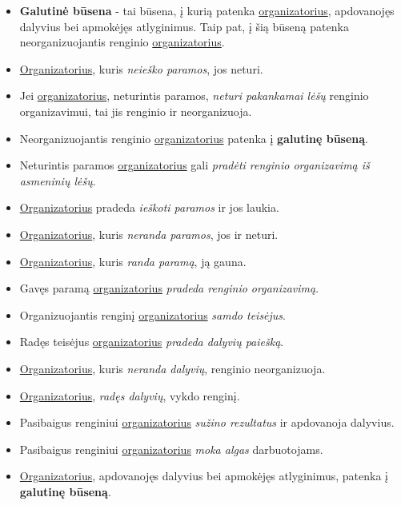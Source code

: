 \documentclass{VUMIFPSkursinis}
\begin{document}
    \begin{itemize}
      \item \textbf{Galutinė būsena} - tai būsena, į kurią patenka \underline{organizatorius}, apdovanojęs dalyvius bei apmokėjęs atlyginimus. Taip pat, į šią būseną patenka neorganizuojantis renginio \underline{organizatorius}.
      \item \underline{Organizatorius}, kuris \textit{neieško paramos}, jos neturi.
      \item Jei \underline{organizatorius}, neturintis paramos, \textit{neturi pakankamai lėšų} renginio organizavimui, tai jis renginio ir neorganizuoja.
      \item Neorganizuojantis renginio \underline{organizatorius} patenka į \textbf{galutinę būseną}.
      \item Neturintis paramos \underline{organizatorius} gali \textit{pradėti renginio organizavimą iš asmeninių lėšų}.
      \item \underline{Organizatorius} pradeda \textit{ieškoti paramos} ir jos laukia.
      \item \underline{Organizatorius}, kuris \textit{neranda paramos}, jos ir neturi.
      \item \underline{Organizatorius}, kuris \textit{randa paramą}, ją gauna.
      \item Gavęs paramą \underline{organizatorius} \textit{pradeda renginio organizavimą}.
      \item Organizuojantis renginį \underline{organizatorius} \textit{samdo teisėjus}.
      \item Radęs teisėjus \underline{organizatorius} \textit{pradeda dalyvių paiešką}.
      \item \underline{Organizatorius}, kuris \textit{neranda dalyvių}, renginio neorganizuoja.
      \item \underline{Organizatorius}, \textit{radęs dalyvių}, vykdo renginį.
      \item Pasibaigus renginiui \underline{organizatorius} \textit{sužino rezultatus} ir apdovanoja dalyvius.
      \item Pasibaigus renginiui \underline{organizatorius} \textit{moka algas} darbuotojams.
      \item \underline{Organizatorius}, apdovanojęs dalyvius bei apmokėjęs atlyginimus, patenka į \textbf{galutinę būseną}.
    \end{itemize}
\end{document}
